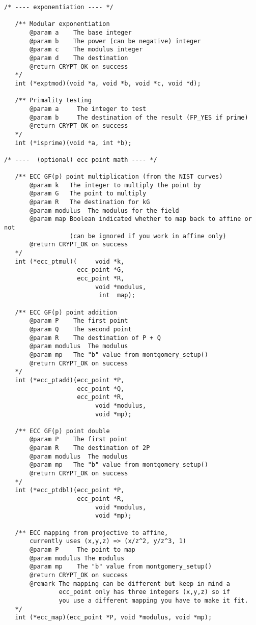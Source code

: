 \documentclass[synpaper]{book}
\begin{document}
\begin{small}
\begin{verbatim}
/* ---- exponentiation ---- */

   /** Modular exponentiation
       @param a    The base integer
       @param b    The power (can be negative) integer
       @param c    The modulus integer
       @param d    The destination
       @return CRYPT_OK on success
   */
   int (*exptmod)(void *a, void *b, void *c, void *d);

   /** Primality testing
       @param a     The integer to test
       @param b     The destination of the result (FP_YES if prime)
       @return CRYPT_OK on success
   */
   int (*isprime)(void *a, int *b);

/* ----  (optional) ecc point math ---- */

   /** ECC GF(p) point multiplication (from the NIST curves)
       @param k   The integer to multiply the point by
       @param G   The point to multiply
       @param R   The destination for kG
       @param modulus  The modulus for the field
       @param map Boolean indicated whether to map back to affine or not
                  (can be ignored if you work in affine only)
       @return CRYPT_OK on success
   */
   int (*ecc_ptmul)(     void *k,
                    ecc_point *G,
                    ecc_point *R,
                         void *modulus,
                          int  map);

   /** ECC GF(p) point addition
       @param P    The first point
       @param Q    The second point
       @param R    The destination of P + Q
       @param modulus  The modulus
       @param mp   The "b" value from montgomery_setup()
       @return CRYPT_OK on success
   */
   int (*ecc_ptadd)(ecc_point *P,
                    ecc_point *Q,
                    ecc_point *R,
                         void *modulus,
                         void *mp);

   /** ECC GF(p) point double
       @param P    The first point
       @param R    The destination of 2P
       @param modulus  The modulus
       @param mp   The "b" value from montgomery_setup()
       @return CRYPT_OK on success
   */
   int (*ecc_ptdbl)(ecc_point *P,
                    ecc_point *R,
                         void *modulus,
                         void *mp);

   /** ECC mapping from projective to affine,
       currently uses (x,y,z) => (x/z^2, y/z^3, 1)
       @param P     The point to map
       @param modulus The modulus
       @param mp    The "b" value from montgomery_setup()
       @return CRYPT_OK on success
       @remark The mapping can be different but keep in mind a
               ecc_point only has three integers (x,y,z) so if
               you use a different mapping you have to make it fit.
   */
   int (*ecc_map)(ecc_point *P, void *modulus, void *mp);


\end{verbatim}
\end{small}
\end{document}
